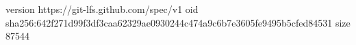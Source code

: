 version https://git-lfs.github.com/spec/v1
oid sha256:642f271d99f3df3caa62329ae0930244c474a9c6b7e3605fe9495b5cfed84531
size 87544
